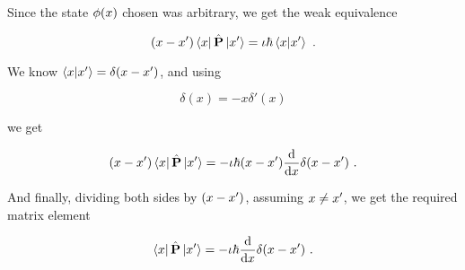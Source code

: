 Since the state $\phi(x)$ chosen was arbitrary,
we get the weak equivalence

\begin{equation}
    (x - x')\bra{x}\hat{\textbf{P}}\ket{x'} =
    \iota \hbar \braket{x}{x'}~.
\end{equation}

We know $\braket{x}{x'} = \delta(x - x')$, and using

\begin{equation}
    \delta(x) = -x\delta'(x)
    \nonumber
\end{equation}

we get

\begin{equation}
    (x - x')\bra{x}\hat{\textbf{P}}\ket{x'} =
    - \iota \hbar (x - x') \dv{}{x}
    \delta(x - x')~.
\end{equation}

And finally, dividing both sides by $(x - x')$, assuming
$x \not = x'$, we get the required matrix element

\begin{equation}
    \bra{x}\hat{\textbf{P}}\ket{x'} =
    - \iota \hbar \dv{}{x}\delta(x - x')~.
\end{equation}

\begin{flushright}
    \qedsymbol
\end{flushright}

